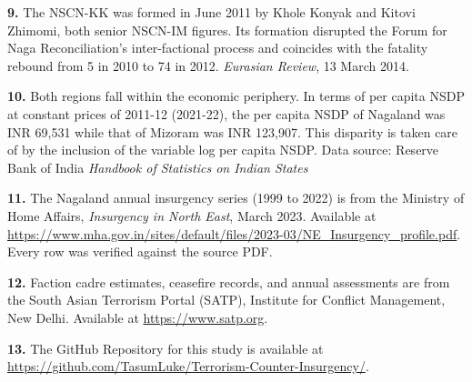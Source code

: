 \documentclass[12pt,a4paper]{article}
\begin{document}
\noindent\textbf{9.} The NSCN-KK was formed in June 2011 by Khole Konyak and Kitovi Zhimomi, both senior NSCN-IM figures. Its formation disrupted the Forum for Naga Reconciliation's inter-factional process and coincides with the fatality rebound from 5 in 2010 to 74 in 2012. \textit{Eurasian Review}, 13 March 2014.

\vspace{0.4em}

\noindent\textbf{10.} Both regions fall within the economic periphery. In terms of per capita NSDP at constant prices of 2011-12 (2021-22), the per capita NSDP of Nagaland was INR 69,531 while that of Mizoram was INR 123,907. This disparity is taken care of by the inclusion of the variable log per capita NSDP. Data source: Reserve Bank of India \textit{Handbook of Statistics on Indian States}

\vspace{0.4em}

\noindent\textbf{11.} The Nagaland annual insurgency series (1999 to 2022) is from the Ministry of Home Affairs, \textit{Insurgency in North East}, March 2023. Available at \url{https://www.mha.gov.in/sites/default/files/2023-03/NE_Insurgency_profile.pdf}. Every row was verified against the source PDF.

\vspace{0.4em}

\noindent\textbf{12.} Faction cadre estimates, ceasefire records, and annual assessments are from the South Asian Terrorism Portal (SATP), Institute for Conflict Management, New Delhi. Available at \url{https://www.satp.org}.
\vspace{0.4em}

\noindent\textbf{13.} The GitHub Repository for this study is available at \url{https://github.com/TasumLuke/Terrorism-Counter-Insurgency/}.
\end{document}
